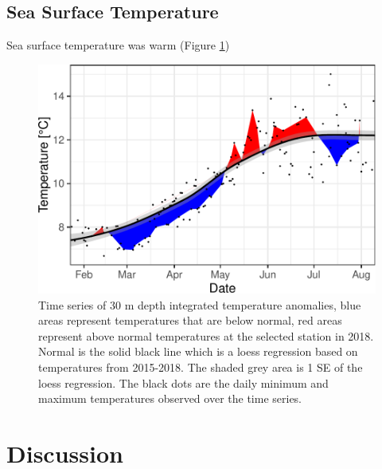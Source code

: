 \documentclass[fleqn,10pt]{wlpeerj} %
\begin{document}
\subsection*{Sea Surface Temperature}\label{sea-surface-temperature}

Sea surface temperature was warm (Figure \ref{fig:sst})

\begin{figure}
\includegraphics[width=0.8\linewidth]{peer_j_migration_dynamics_files/figure-latex/sst-1} \caption{Time series of 30 m depth integrated temperature anomalies, blue areas represent temperatures that are below normal, red areas represent above normal temperatures at the selected station in 2018. Normal is the solid black line which is a loess regression based on temperatures from 2015-2018. The shaded grey area is 1 SE of the loess regression. The black dots are the daily minimum and maximum temperatures observed over the time series.}\label{fig:sst}
\end{figure}

\section*{Discussion}\label{discussion}
\end{document}
